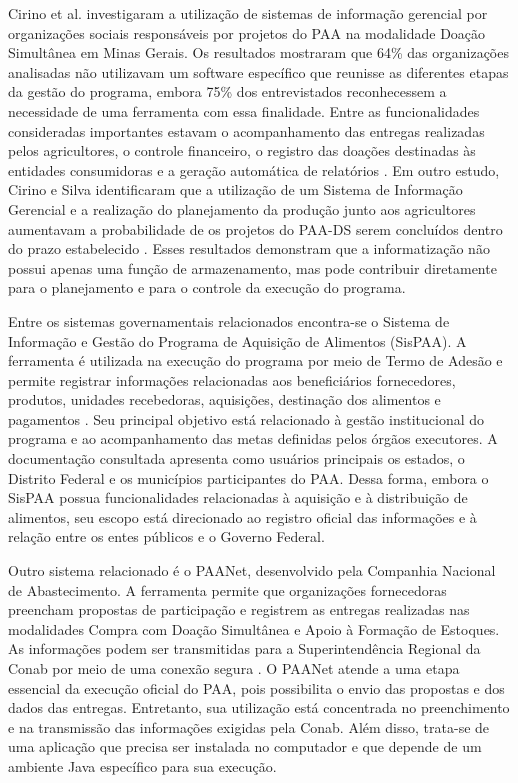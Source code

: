 Cirino et al. investigaram a utilização de sistemas de informação gerencial por organizações sociais responsáveis por projetos do PAA na modalidade Doação Simultânea em Minas Gerais. Os resultados mostraram que 64\% das organizações analisadas não utilizavam um software específico que reunisse as diferentes etapas da gestão do programa, embora 75\% dos entrevistados reconhecessem a necessidade de uma ferramenta com essa finalidade. Entre as funcionalidades consideradas importantes estavam o acompanhamento das entregas realizadas pelos agricultores, o controle financeiro, o registro das doações destinadas às entidades consumidoras e a geração automática de relatórios \cite{cirino2016sistema}. Em outro estudo, Cirino e Silva identificaram que a utilização de um Sistema de Informação Gerencial e a realização do planejamento da produção junto aos agricultores aumentavam a probabilidade de os projetos do PAA-DS serem concluídos dentro do prazo estabelecido \cite{cirino2017prazo}. Esses resultados demonstram que a informatização não possui apenas uma função de armazenamento, mas pode contribuir diretamente para o planejamento e para o controle da execução do programa.

Entre os sistemas governamentais relacionados encontra-se o Sistema de Informação e Gestão do Programa de Aquisição de Alimentos (SisPAA). A ferramenta é utilizada na execução do programa por meio de Termo de Adesão e permite registrar informações relacionadas aos beneficiários fornecedores, produtos, unidades recebedoras, aquisições, destinação dos alimentos e pagamentos \cite{mds2025adesaoPAA,mds2015sispaa}. Seu principal objetivo está relacionado à gestão institucional do programa e ao acompanhamento das metas definidas pelos órgãos executores. A documentação consultada apresenta como usuários principais os estados, o Distrito Federal e os municípios participantes do PAA. Dessa forma, embora o SisPAA possua funcionalidades relacionadas à aquisição e à distribuição de alimentos, seu escopo está direcionado ao registro oficial das informações e à relação entre os entes públicos e o Governo Federal.

Outro sistema relacionado é o PAANet, desenvolvido pela Companhia Nacional de Abastecimento. A ferramenta permite que organizações fornecedoras preencham propostas de participação e registrem as entregas realizadas nas modalidades Compra com Doação Simultânea e Apoio à Formação de Estoques. As informações podem ser transmitidas para a Superintendência Regional da Conab por meio de uma conexão segura \cite{conabPaanet}. O PAANet atende a uma etapa essencial da execução oficial do PAA, pois possibilita o envio das propostas e dos dados das entregas. Entretanto, sua utilização está concentrada no preenchimento e na transmissão das informações exigidas pela Conab. Além disso, trata-se de uma aplicação que precisa ser instalada no computador e que depende de um ambiente Java específico para sua execução.

